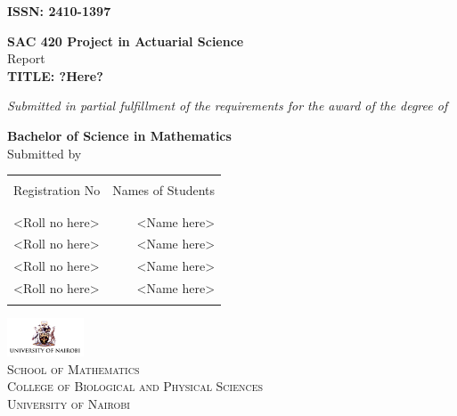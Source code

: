 \documentclass[12pt,a4paper]{report}
\begin{document}
\renewcommand\bibname{References} %

\begin{titlepage}
\begin{center}
\begin{flushright}
{\color{blue}\bf ISSN: 2410-1397}
\end{flushright}
\vspace{2mm}
\begin{center}

\textup{\Large {\bf SAC 420 Project in Actuarial Science} \\[5mm] Report}\\[0.4in]

\Large \textbf { TITLE: ?Here?}\\[0.5in]
  
\end{center}
        \emph{Submitted in partial fulfillment of
        the requirements for the award of the degree of}
        \vspace{.2in}

       {\bf \Large  Bachelor of Science in Mathematics}\\[0.5in]

\normalsize Submitted by \\
\begin{table}[h]
\centering
\begin{tabular}{lr}\hline\\
Registration No & Names of Students \\ \\ \hline
\\
<Roll no here> & <Name here> \\
<Roll no here> & <Name here> \\ 
<Roll no here> & <Name here> \\ 
<Roll no here> & <Name here> \\ \\ \hline 
\end{tabular}
\end{table}

\vspace{.1in}

\vfill
 \includegraphics[width=0.17\textwidth]{uon-logo}\\[4mm]
\textsc{\Large School of Mathematics}\\[2mm]
\normalsize
\textsc{\large College of Biological and Physical Sciences}\\[2mm]
\textsc{\Large University of Nairobi} 


\end{center}
\end{titlepage}
\end{document}
